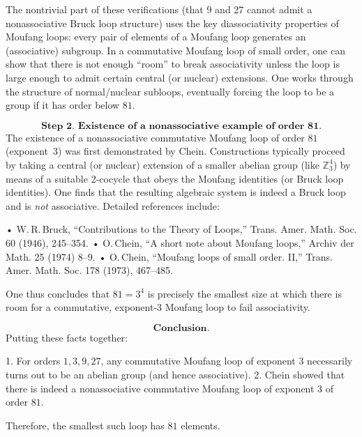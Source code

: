 \documentclass[12p]{article}
\newcounter{answercounter}
\newenvironment{answer}[1][]
{\refstepcounter{answercounter}%
\begin{tcolorbox}[
    title=Answer \theanswercounter: #1,
    colback=white, %
    colframe=gray,
    coltext=black, %
    fonttitle=\bfseries\normalsize,
    top=2mm,
    bottom=2mm,
    enlarge top initially by=5mm
]
\small
}
{\end{tcolorbox}}
\begin{document}
\begin{answer}
The nontrivial part of these verifications (that 9 and 27 cannot admit a nonassociative Bruck loop structure) uses the key diassociativity properties of Moufang loops: every pair of elements of a Moufang loop generates an (associative) subgroup.  In a commutative Moufang loop of small order, one can show that there is not enough “room” to break associativity unless the loop is large enough to admit certain central (or nuclear) extensions.  One works through the structure of normal/nuclear subloops, eventually forcing the loop to be a group if it has order below \(81\).

\[
\textbf{Step 2. Existence of a nonassociative example of order 81.}
\]
The existence of a nonassociative commutative Moufang loop of order \(81\) (exponent~3) was first demonstrated by Chein.  Constructions typically proceed by taking a central (or nuclear) extension of a smaller abelian group (like \(\mathbb{Z}_3^4\)) by means of a suitable 2-cocycle that obeys the Moufang identities (or Bruck loop identities).  One finds that the resulting algebraic system is indeed a Bruck loop and is \emph{not} associative.  Detailed references include:

• W.\,R.\,Bruck, “Contributions to the Theory of Loops,” Trans. Amer. Math. Soc. 60 (1946), 245–354.  
• O.\,Chein, “A short note about Moufang loops,” Archiv der Math. 25 (1974) 8–9.  
• O.\,Chein, “Moufang loops of small order. II,” Trans. Amer. Math. Soc. 178 (1973), 467–485.  

One thus concludes that \(81 = 3^4\) is precisely the smallest size at which there is room for a commutative, exponent-3 Moufang loop to fail associativity.

\[
\textbf{Conclusion.}
\]
Putting these facts together:

1. For orders \(1,3,9,27\), any commutative Moufang loop of exponent 3 necessarily turns out to be an abelian group (and hence associative).  
2. Chein showed that there is indeed a nonassociative commutative Moufang loop of exponent 3 of order \(81\).  

Therefore, the smallest such loop has \(\boxed{81}\) elements.
\end{answer}
\end{document}
